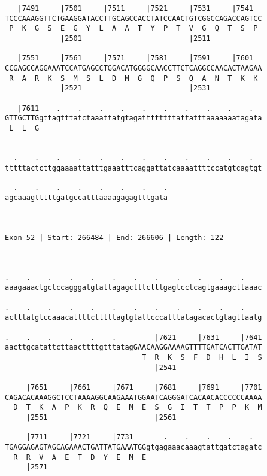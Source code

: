 \documentclass{article}
\begin{document}
\begin{Verbatim}
   |7491     |7501     |7511     |7521     |7531     |7541  
TCCCAAAGGTTCTGAAGGATACCTTGCAGCCACCTATCCAACTGTCGGCCAGACCAGTCC
 P  K  G  S  E  G  Y  L  A  A  T  Y  P  T  V  G  Q  T  S  P 
             |2501                         |2511            
  
   |7551     |7561     |7571     |7581     |7591     |7601  
CCGAGCCAGGAAATCCATGAGCCTGGACATGGGGCAACCTTCTCAGGCCAACACTAAGAA
 R  A  R  K  S  M  S  L  D  M  G  Q  P  S  Q  A  N  T  K  K 
             |2521                         |2531            
  
   |7611    .    .    .    .    .    .    .    .    .    .  
GTTGCTTGgttagtttatctaaattatgtagattttttttattatttaaaaaaatagata
 L  L  G                                                    
                                                            
  
  .    .    .    .    .    .    .    .    .    .    .    .  
tttttactcttggaaaattatttgaaatttcaggattatcaaaattttccatgtcagtgt
                                                            
  .    .    .    .    .    .    .    .
agcaaagtttttgatgccatttaaaagagagtttgata
                                      
                                      
 
Exon 52 | Start: 266484 | End: 266606 | Length: 122



.    .    .    .    .    .    .    .    .    .    .    .    
aaagaaactgctccagggatgtattagagctttctttgagtcctcagtgaaagcttaaac
                                                            
.    .    .    .    .    .    .    .    .    .    .    .    
actttatgtccaaacattttctttttagtgtattcccatttatagacactgtagttaatg
                                                            
.    .    .    .    .    .         |7621     |7631     |7641
aacttgcatattcttaacttttgtttatagGAACAAGGAAAAGTTTTGATCACTTGATAT
                                T  R  K  S  F  D  H  L  I  S
                                   |2541                    
  
     |7651     |7661     |7671     |7681     |7691     |7701
CAGACACAAAGGCTCCTAAAAGGCAAGAAATGGAATCAGGGATCACAACACCCCCCAAAA
  D  T  K  A  P  K  R  Q  E  M  E  S  G  I  T  T  P  P  K  M
     |2551                         |2561                    
  
     |7711     |7721     |7731       .    .    .    .    .  
TGAGGAGAGTAGCAGAAACTGATTATGAAATGGgtgagaaacaaagtattgatctagatc
  R  R  V  A  E  T  D  Y  E  M  E                           
     |2571                                                  
  

\end{Verbatim}
\end{document}
